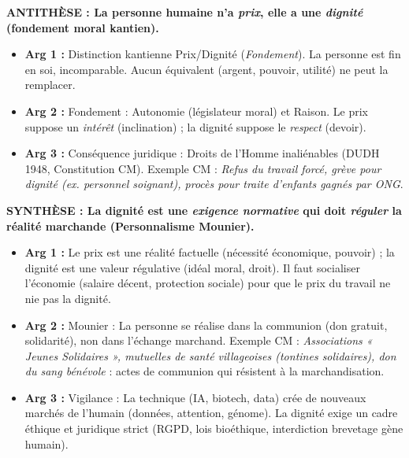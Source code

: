 \documentclass[11pt]{article}
\newcommand{\cle}[1]{{\popxbold\color{popdark}#1}}
\begin{document}
\begin{corrige}
\begin{enumerate}
    \textbf{ANTITHÈSE : La personne humaine n'a \emph{prix}, elle a une \emph{dignité} (fondement moral kantien).}
    \begin{itemize}
        \item \textbf{Arg 1 :} Distinction kantienne Prix/Dignité (\emph{Fondement}). La personne est \cle{fin en soi}, \cle{incomparable}. Aucun équivalent (argent, pouvoir, utilité) ne peut la remplacer.
        \item \textbf{Arg 2 :} Fondement : \cle{Autonomie} (législateur moral) et \cle{Raison}. Le prix suppose un \emph{intérêt} (inclination) ; la dignité suppose le \emph{respect} (devoir).
        \item \textbf{Arg 3 :} Conséquence juridique : Droits de l'Homme inaliénables (DUDH 1948, Constitution CM). Exemple CM : \emph{Refus du travail forcé, grève pour dignité (ex. personnel soignant), procès pour traite d'enfants gagnés par ONG}.
    \end{itemize}

    \textbf{SYNTHÈSE : La dignité est une \emph{exigence normative} qui doit \emph{réguler} la réalité marchande (Personnalisme Mounier).}
    \begin{itemize}
        \item \textbf{Arg 1 :} Le prix est une \cle{réalité factuelle} (nécessité économique, pouvoir) ; la dignité est une \cle{valeur régulative} (idéal moral, droit). Il faut \cle{socialiser} l'économie (salaire décent, protection sociale) pour que le prix du travail ne nie pas la dignité.
        \item \textbf{Arg 2 :} \cle{Mounier} : La personne se réalise dans la \cle{communion} (don gratuit, solidarité), non dans l'échange marchand. Exemple CM : \emph{Associations « Jeunes Solidaires », mutuelles de santé villageoises (tontines solidaires), don du sang bénévole} : actes de communion qui résistent à la marchandisation.
        \item \textbf{Arg 3 :} Vigilance : La technique (IA, biotech, data) crée de nouveaux marchés de l'humain (données, attention, génome). La dignité exige un \cle{cadre éthique et juridique} strict (RGPD, lois bioéthique, interdiction brevetage gène humain).
    \end{itemize}


\end{enumerate}
\end{corrige}
\end{document}

